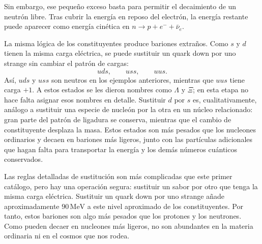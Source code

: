 \begin{classroomqa}
\end{classroomqa}

Sin embargo, ese pequeño exceso basta para permitir el decaimiento de un neutrón libre. Tras cubrir la energía en reposo del electrón, la energía restante puede aparecer como energía cinética en \(n\to p+e^-+\bar\nu_e\).

La misma lógica de los constituyentes produce bariones extraños. Como \(s\) y \(d\) tienen la misma carga eléctrica, se puede sustituir un quark down por uno strange sin cambiar el patrón de cargas:
\begin{equation}
uds,\qquad uss,\qquad uus.
\end{equation}
Así, \(uds\) y \(uss\) son neutros en los ejemplos anteriores, mientras que \(uus\) tiene carga \(+1\). A estos estados se les dieron nombres como \(\Lambda\) y \(\Xi\); en esta etapa no hace falta asignar esos nombres en detalle. Sustituir \(d\) por \(s\) es, cualitativamente, análogo a sustituir una especie de nucleón por la otra en un núcleo relacionado: gran parte del patrón de ligadura se conserva, mientras que el cambio de constituyente desplaza la masa. Estos estados son más pesados que los nucleones ordinarios y decaen en bariones más ligeros, junto con las partículas adicionales que hagan falta para transportar la energía y los demás números cuánticos conservados.

\begin{classroomqa}
\end{classroomqa}

Las reglas detalladas de sustitución son más complicadas que este primer catálogo, pero hay una operación segura: sustituir un sabor por otro que tenga la misma carga eléctrica. Sustituir un quark down por uno strange añade aproximadamente \(90\,\mathrm{MeV}\) a este nivel aproximado de los constituyentes. Por tanto, estos bariones son algo más pesados que los protones y los neutrones. Como pueden decaer en nucleones más ligeros, no son abundantes en la materia ordinaria ni en el cosmos que nos rodea.

